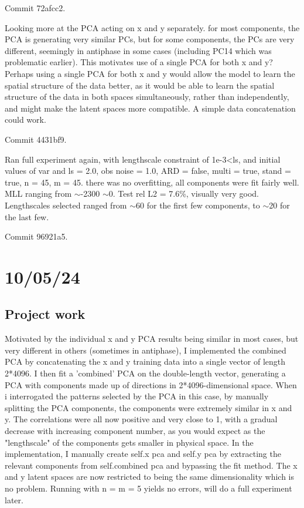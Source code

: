 \documentclass[11pt,a4paper]{article}
\begin{document}
Commit 72afcc2.

Looking more at the PCA acting on x and y separately.
for most components, the PCA is generating very similar PCs, but for some components, the PCs are very different, seemingly in antiphase in some cases (including PC14 which was problematic earlier).
This motivates use of a single PCA for both x and y? 
Perhaps using a single PCA for both x and y would allow the model to learn the spatial structure of the data better, as it would be able to learn the spatial structure of the data in both spaces simultaneously, rather than independently, and might make the latent spaces more compatible.
A simple data concatenation could work.

Commit 4431bf9.

Ran full experiment again, with lengthscale constraint of 1e-3\textless ls, and initial values of var and ls = 2.0, obs noise = 1.0, ARD = false, multi = true, stand = true, n = 45, m = 45.
there was no overfitting, all components were fit fairly well. 
MLL ranging from $\sim$-2300 \- $\sim$0.
Test rel L2 = 7.6\%, visually very good.
Lengthscales selected ranged from $\sim$60 for the first few components, to $\sim$20 for the last few.

Commit 96921a5.

\section{10/05/24}

\subsection{Project work}

Motivated by the individual x and y PCA results being similar in most cases, but very different in others (sometimes in antiphase), I implemented the combined PCA by concatenating the x and y training data into a single vector of length 2*4096.
I then fit a 'combined' PCA on the double-length vector, generating a PCA with components made up of directions in 2*4096-dimensional space.
When i interrogated the patterns selected by the PCA in this case, by manually splitting the PCA components, the components were extremely similar in x and y.
The correlations were all now positive and very close to 1, with a gradual decrease with increasing component number, as you would expect as the "lengthscale" of the components gets smaller in physical space.
In the implementation, I manually create self.x pca and self.y pca by extracting the relevant components from self.combined pca and bypassing the fit method.
The x and y latent spaces are now restricted to being the same dimensionality which is no problem.
Running with n = m = 5 yields no errors, will do a full experiment later.
\end{document}
